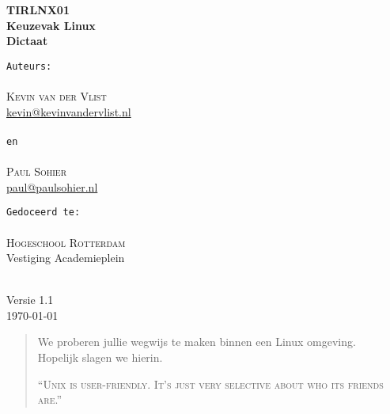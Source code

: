 \documentclass[a4paper,11pt]{report}
\begin{document}
\begin{titlepage}
\vspace*{\fill}
\begin{center}

\textsc{\Huge \bfseries TIRLNX01}\\[0.5cm]
{\large \bfseries Keuzevak Linux}\\[0.25cm]
{\large \bfseries Dictaat}\\[1.5cm]

\begin{minipage}{0.4\textwidth}
\begin{flushleft} \large
\texttt{Auteurs:}\\
\ \\
\textsc{Kevin van der Vlist}\\
\href{mailto:kevin@kevinvandervlist.nl}{kevin@kevinvandervlist.nl}\\
\ \\
\texttt{en}\\
\ \\
\textsc{Paul Sohier}\\
\href{mailto:paul@paulsohier.nl}{paul@paulsohier.nl}
\end{flushleft}
\end{minipage}
\begin{minipage}{0.5\textwidth}

\begin{flushright} \large
\texttt{Gedoceerd te:}\\
\ \\
\textsc{Hogeschool Rotterdam}\\
Vestiging Academieplein
\end{flushright}
\end{minipage}
{\ }\\[1.5cm]
{\large Versie 1.1}\\[0.75cm]
{\large \today}
\vfill
\end{center}
\vspace*{\fill}
\end{titlepage}

\begin{abstract}\centering
We proberen jullie wegwijs te maken binnen een Linux omgeving.\\
Hopelijk slagen we hierin.

\textsc{``Unix is user-friendly. It's just very selective about who its friends are.''}
\end{abstract}

{}
\end{document}

